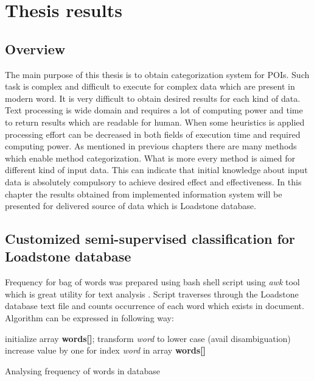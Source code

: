 \chapter{Thesis results}

\section{Overview}
The main purpose of this thesis is to obtain categorization system for POIs. Such task is complex and difficult to execute for complex data which are present in modern word. It is very difficult to obtain desired results for each kind of data. Text processing is wide domain and requires a lot of computing power and time to return results which are readable for human. When some heuristics is applied processing effort can be decreased in both fields of execution time and required computing power. As mentioned in previous chapters there are many methods which enable method categorization. What is more every method is aimed for different kind of input data. This can indicate that initial knowledge about input data is absolutely compulsory to achieve desired effect and effectiveness. In this chapter the results obtained from implemented information system will be presented for delivered source of data which is Loadstone database.

\section{Customized semi-supervised classification for Loadstone database}
\label{analyze_db}
Frequency for bag of words was prepared using bash shell script using \textit{awk} tool which is great utility for text analysis \cite{21}. Script traverses through the Loadstone database text file and counts occurrence of each word which exists in document. Algorithm can be expressed in following way:
\begin{algorithm}[h]
	initialize array \textbf{words[]};
	\newline
	{
		transform \textit{word} to lower case (avail disambiguation)
		\newline
		increase value by one for index \textit{word} in array \textbf{words[]} 
	}
	\caption{Analysing frequency of words in database}
	\label{alg:analyze_freuency}
\end{algorithm}

